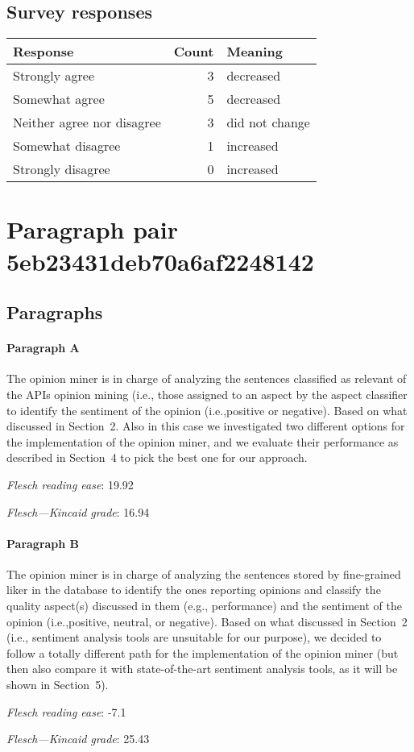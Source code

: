 \subsection{Survey responses}
\begin{tabular}{lrl}
\toprule
          \textbf{Response} &  \textbf{Count} & \textbf{Meaning} \\
\midrule
             Strongly agree &               3 &        decreased \\
             Somewhat agree &               5 &        decreased \\
 Neither agree nor disagree &               3 &   did not change \\
          Somewhat disagree &               1 &        increased \\
          Strongly disagree &               0 &        increased \\
\bottomrule
\end{tabular}

\section{Paragraph pair 5eb23431deb70a6af2248142}
\subsection{Paragraphs}
\paragraph{Paragraph A}
The opinion miner is in charge of analyzing the sentences classified as relevant of the APIs opinion mining (i.e., those assigned to an aspect by the aspect classifier to identify the sentiment of the opinion (i.e.,positive or negative). Based on what discussed in Section 2. Also in this case we investigated two different options for the implementation of the opinion miner, and we evaluate their performance as described in Section 4 to pick the best one for our approach.\par\medskip
\emph{Flesch reading ease}: 19.92\par
\emph{Flesch---Kincaid grade}: 16.94

\paragraph{Paragraph B}
The opinion miner is in charge of analyzing the sentences stored by fine-grained liker in the database to identify the ones reporting opinions and classify the quality aspect(s) discussed in them (e.g., performance) and the sentiment of the opinion (i.e.,positive, neutral, or negative). Based on what discussed in Section 2 (i.e., sentiment analysis tools are unsuitable for our purpose), we decided to follow a totally different path for the implementation of the opinion miner (but then also compare it with state-of-the-art sentiment analysis tools, as it will be shown in Section 5).\par\medskip
\emph{Flesch reading ease}: -7.1\par
\emph{Flesch---Kincaid grade}: 25.43

